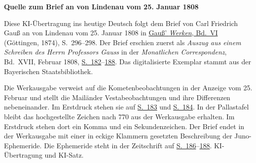 \clearpage\thispagestyle{empty}
\begin{center}\textbf{Quelle zum Brief an von Lindenau vom 25. Januar 1808}\end{center}
\noindent Diese KI-Übertragung ins heutige Deutsch folgt dem Brief von Carl Friedrich Gauß an von Lindenau vom 25. Januar 1808 in \href{https://gdz.sub.uni-goettingen.de/id/PPN236007467}{Gauß’ \textit{Werken}, Bd.~VI} (Göttingen, 1874), S.~296--298. Der Brief erschien zuerst als \textit{Auszug aus einem Schreiben des Herrn Professors Gauss} in der \textit{Monatlichen Correspondenz}, Bd.~XVII, Februar 1808, \href{https://www.digitale-sammlungen.de/en/view/bsb10538608?page=188}{S.~182}--\href{https://www.digitale-sammlungen.de/en/view/bsb10538608?page=194}{188}. Das digitalisierte Exemplar stammt aus der Bayerischen Staatsbibliothek.
\par\medskip
Die Werkausgabe verweist auf die Kometenbeobachtungen in der Anzeige vom 25. Februar und stellt die Mailänder Vestabeobachtungen und ihre Differenzen nebeneinander. Im Erstdruck stehen sie auf \href{https://www.digitale-sammlungen.de/en/view/bsb10538608?page=189}{S.~183} und \href{https://www.digitale-sammlungen.de/en/view/bsb10538608?page=190}{S.~184}. In der Pallastafel bleibt das hochgestellte Zeichen nach 770 aus der Werkausgabe erhalten. Im Erstdruck stehen dort ein Komma und ein Sekundenzeichen. Der Brief endet in der Werkausgabe mit einer in eckige Klammern gesetzten Beschreibung der Juno-Ephemeride. Die Ephemeride steht in der Zeitschrift auf \href{https://www.digitale-sammlungen.de/en/view/bsb10538608?page=192}{S.~186}--\href{https://www.digitale-sammlungen.de/en/view/bsb10538608?page=194}{188}. KI-Übertragung und KI-Satz.
\clearpage

